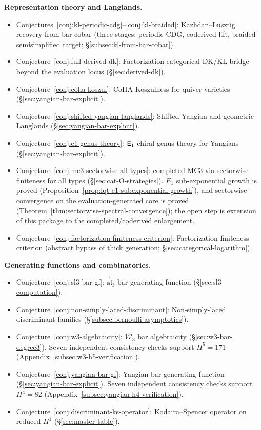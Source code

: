 \smallskip
\noindent\textbf{Representation theory and Langlands.}

\begin{itemize}[nosep]
\item Conjectures~\ref{conj:kl-periodic-cdg}--\ref{conj:kl-braided}:
  Kazhdan--Lusztig recovery from bar-cobar (three stages:
  periodic CDG, coderived lift, braided semisimplified target;
  \S\ref{subsec:kl-from-bar-cobar}).
\item Conjecture~\ref{conj:full-derived-dk}:
  Factorization-categorical DK/KL bridge beyond the evaluation locus
  (\S\ref{sec:derived-dk}).
\item Conjecture~\ref{conj:coha-koszul}:
  CoHA Koszulness for quiver varieties
  (\S\ref{sec:yangian-bar-explicit}).
\item Conjecture~\ref{conj:shifted-yangian-langlands}:
  Shifted Yangian and geometric Langlands
  (\S\ref{sec:yangian-bar-explicit}).
\item Conjecture~\ref{conj:e1-genus-theory}:
  $\mathsf{E}_1$-chiral genus theory for Yangians
  (\S\ref{sec:yangian-bar-explicit}).
\item Conjecture~\ref{conj:mc3-sectorwise-all-types}:
  completed MC3 via sectorwise finiteness for all types
  (\S\ref{sec:cat-O-strategies}).  $E_1$ sub-exponential growth is
  proved
  (Proposition~\ref{prop:lqt-e1-subexponential-growth}), and
  sectorwise convergence on the evaluation-generated core is proved
  (Theorem~\ref{thm:sectorwise-spectral-convergence}); the open step
  is extension of this package to the completed/coderived
  enlargement.
\item Conjecture~\ref{conj:factorization-finiteness-criterion}:
  Factorization finiteness criterion (abstract bypass of thick
  generation; \S\ref{sec:categorical-logarithm}).
\end{itemize}

\smallskip
\noindent\textbf{Generating functions and combinatorics.}
\begin{itemize}[nosep]
\item Conjecture~\ref{conj:sl3-bar-gf}:
  $\widehat{\mathfrak{sl}}_3$ bar generating function
  (\S\ref{sec:sl3-computation}).
\item Conjecture~\ref{conj:non-simply-laced-discriminant}:
  Non-simply-laced discriminant families
  (\S\ref{subsec:bernoulli-asymptotics}).
\item Conjecture~\ref{conj:w3-algebraicity}:
  $\mathcal{W}_3$ bar algebraicity
  (\S\ref{sec:w3-bar-degree3}).
  Seven independent consistency checks support $H^5 = 171$
  (Appendix~\ref{subsec:w3-h5-verification}).
\item Conjecture~\ref{conj:yangian-bar-gf}:
  Yangian bar generating function
  (\S\ref{sec:yangian-bar-explicit}).
  Seven independent consistency checks support $H^4 = 82$
  (Appendix~\ref{subsec:yangian-h4-verification}).
\item Conjecture~\ref{conj:discriminant-ks-operator}:
  Kodaira--Spencer operator on reduced $H^1$
  (\S\ref{sec:master-table}).
\end{itemize}

